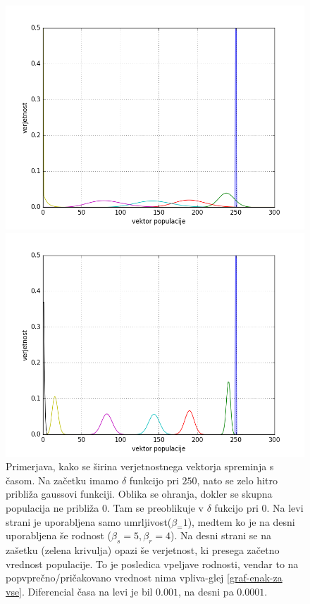 \documentclass[slovene,11pt,a4paper]{article}
\numberwithin{equation}{section} %
\numberwithin{figure}{section} %
\numberwithin{table}{section} %
\begin{document}
\begin{figure}[h]
\centering
\begin{minipage}{0.5\textwidth}
\centering
\includegraphics[scale=0.45]{slike/smrtnost_rodnost_disperzija.png}
\end{minipage}\hfill
\begin{minipage}{0.5\textwidth}
\centering
\includegraphics[scale=0.45]{slike/test.png}
\end{minipage}
\caption{Primerjava, kako se širina verjetnostnega vektorja spreminja s časom. Na začetku imamo $\delta$ funkcijo pri $250$, nato se zelo hitro približa gaussovi funkciji. Oblika se ohranja, dokler se skupna populacija ne približa $0$. Tam se preoblikuje v $\delta$ fukcijo pri $0$. Na levi strani je uporabljena samo umrljivost($\beta_=1$), medtem ko je na desni uporabljena še rodnost ($\beta_s=5, \beta_r=4$). Na desni strani se na zašetku (zelena krivulja) opazi še verjetnost, ki presega začetno vrednost populacije. To je posledica vpeljave rodnosti, vendar to na popvprečno/pričakovano vrednost nima vpliva-glej \ref{graf-enak-za vse}. Diferencial časa na levi je bil $0.001$, na desni pa $0.0001$.}
\end{figure}
\end{document}
